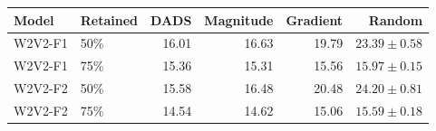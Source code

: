 \begin{tabular}{@{}llrrrr@{}}
\toprule
Model & Retained & DADS & Magnitude & Gradient & Random\\
\midrule
W2V2-F1 & 50\% & 16.01 & 16.63 & 19.79 & $23.39\pm0.58$\\
W2V2-F1 & 75\% & 15.36 & 15.31 & 15.56 & $15.97\pm0.15$\\
W2V2-F2 & 50\% & 15.58 & 16.48 & 20.48 & $24.20\pm0.81$\\
W2V2-F2 & 75\% & 14.54 & 14.62 & 15.06 & $15.59\pm0.18$\\
\bottomrule
\end{tabular}
